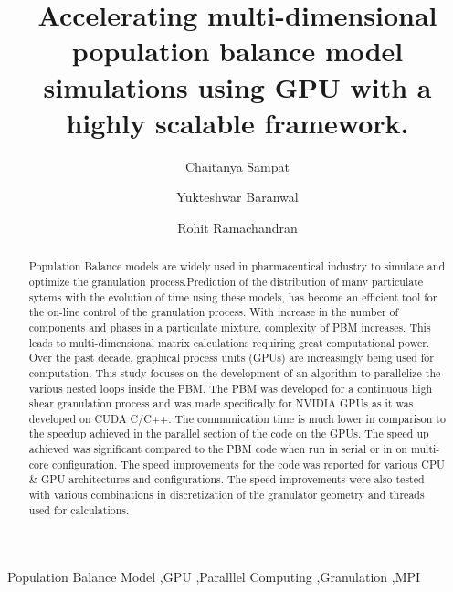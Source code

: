 \documentclass[preprint,10pt,authoryear]{elsarticle}
\begin{document}
\begin{frontmatter}
\title{Accelerating multi-dimensional population balance model simulations using GPU with a highly scalable framework.}


\author[label1]{Chaitanya Sampat}
\author[label1]{Yukteshwar Baranwal}
\address[label1]{Chemical and Biochemical Engineering, Rutgers University, Piscataway, NJ, USA - 08854}
\author[label1]{Rohit Ramachandran}

\begin{abstract}
Population Balance models are widely used in pharmaceutical industry to simulate
and optimize the granulation process.Prediction of the distribution of many 
particulate sytems with the evolution of time using these models, has become an 
efficient tool for the on-line control of the granulation process. 
With increase in the number of components and phases in a particulate mixture, 
complexity of PBM increases. This leads to multi-dimensional matrix calculations 
requiring great computational power. Over the past decade, graphical process 
units (GPUs) are increasingly being used for computation. This study focuses on the 
development of an algorithm to parallelize the various nested loops inside the PBM. 
The PBM was developed for a continuous high shear granulation process and was made 
specifically for NVIDIA GPUs as it was developed on CUDA C/C++. The communication 
time is much lower in comparison to the speedup achieved in the parallel section 
of the code on the GPUs. The speed up achieved was significant compared to the PBM 
code when run in serial or in on multi-core configuration. The speed improvements 
for the code was reported for various CPU \& GPU architectures and configurations. 
The speed improvements were also tested with various combinations in 
discretization of the granulator geometry and threads used for calculations. 
\end{abstract}

\begin{keyword}
Population Balance Model \sep GPU \sep Paralllel Computing \sep Granulation \sep MPI
\end{keyword}

\end{frontmatter}
\end{document}
